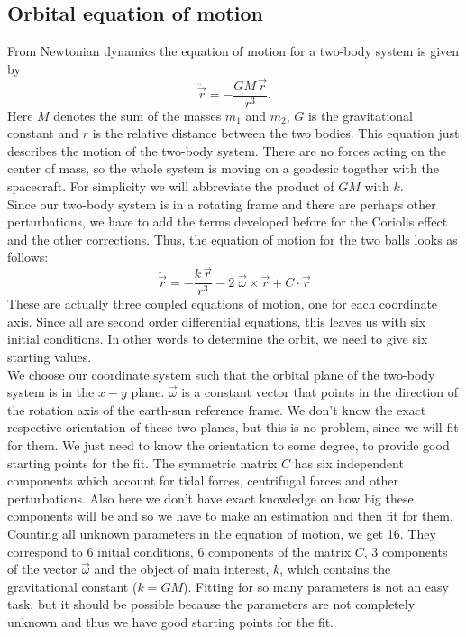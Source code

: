 \documentclass[prb,preprint]{revtex4-1}
\begin{document}
\subsection{Orbital equation of motion}
From Newtonian dynamics the equation of motion for a two-body system is given by 
\begin{equation}
\label{eq:eomeasy}
\ddot{\vec{r}} = - \frac{G M\, \vec{r}}{r^3}.
\end{equation}
Here $M$ denotes the sum of the masses $m_1$ and $m_2$, $G$ is the gravitational constant and $r$ is the relative distance between the two bodies. This equation just describes the motion of the two-body system. There are no forces acting on the center of mass, so the whole system is moving on a geodesic together with the spacecraft. For simplicity we will abbreviate the product of $GM$ with $k$.\\
Since our two-body system is in a rotating frame and there are perhaps other perturbations, we have to add the terms developed before for the Coriolis effect and the other corrections. Thus, the equation of motion for the two balls looks as follows:
\begin{equation}
\label{eq:eom}
\ddot{\vec{r}} = - \frac{k\,\vec{r}}{r^3} - 2 \; \vec{\omega} \times \dot{\vec{r}} + C \cdot \vec{r}
\end{equation}
These are actually three coupled equations of motion, one for each coordinate axis. Since all are second order differential equations, this leaves us with six initial conditions. In other words to determine the orbit, we need to give six starting values.\\
We choose our coordinate system such that the orbital plane of the two-body system is in the $x-y$ plane. $\vec{\omega}$ is a constant vector that points in the direction of the rotation axis of the earth-sun reference frame. We don't know the exact respective orientation of these two planes, but this is no problem, since we will fit for them. We just need to know the orientation to some degree, to provide good starting points for the fit.
The symmetric matrix $C$ has six independent components which account for tidal forces, centrifugal forces and other perturbations. Also here we don't have exact knowledge on how big these components will be and so we have to make an estimation and then fit for them. \\

Counting all unknown parameters in the equation of motion, we get 16. They correspond to 6 initial conditions, 6 components of the matrix $C$, 3 components of the vector $\vec{\omega}$ and the object of main interest, $k$,  which contains the gravitational constant ($k = GM$). Fitting for so many parameters is not an easy task, but it should be possible because the parameters are not completely unknown and thus we have good starting points for the fit.\\
\end{document}
